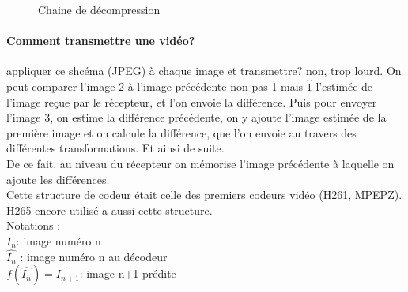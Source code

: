 \documentclass[main.tex]{subfiles}
\begin{document}
\begin{figure}[H]
  \centering
{}
\caption{Chaine de décompression}
\end{figure}

\paragraph{Comment transmettre une vidéo?} appliquer ce shcéma (JPEG) à chaque image et transmettre? non, trop lourd.
On peut comparer l'image 2 à l'image précédente non pas 1 mais $\hat{1}$ l'estimée de l'image reçue par le récepteur, et l'on envoie la différence. Puis pour envoyer l'image 3, on estime la différence précédente, on y ajoute l'image estimée de la première image et on calcule la différence, que l'on envoie au travers des différentes transformations. Et ainsi de suite.\\

De ce fait, au niveau du récepteur on mémorise l'image précédente à laquelle on ajoute les différences.\\

Cette structure de codeur était celle des premiers codeurs vidéo (H261, MPEPZ). H265 encore utilisé a aussi cette structure.\\

\noindent Notations :\\
$I_n$: image numéro n\\
$\hat{I_n}$ : image numéro n au décodeur\\
$f(\hat{I_n}) = \tilde{I_{n+1}}$: image n+1 prédite\\
\end{document}
